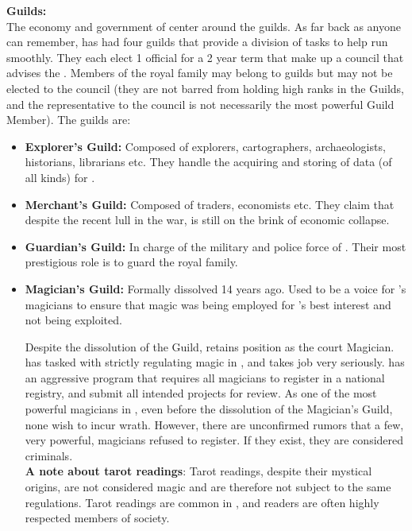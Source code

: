 \documentclass[blue]{NeptuneBall}
\begin{document}
{\bf Guilds:}\\
The economy and government of \pAtlantis{} center around the guilds. As far back as anyone can remember, \pAtlantis{} has had four guilds that provide a division of tasks to help \pAtlantis{} run smoothly. They each elect 1 official for a 2 year term that make up a council that advises the \cKing{\King}.  Members of the royal family may belong to guilds but may not be elected to the council (they are not barred from holding high ranks in the Guilds, and the representative to the council is not necessarily the most powerful Guild Member). The guilds are:
\begin{itemize}
  \item {\bf Explorer's Guild:} Composed of explorers, cartographers, archaeologists, historians, librarians etc. They handle the acquiring and storing of data (of all kinds) for \pAtlantis{}.
  \item{\bf Merchant's Guild:} Composed of traders, economists etc. They claim that despite the recent lull in the war, \pAtlantis{} is still on the brink of economic collapse.
  \item {\bf Guardian's Guild:} In charge of the military and police force of \pAtlantis{}. Their most prestigious role is to guard the royal family.
  \item {\bf Magician's Guild:}  Formally dissolved 14 years ago. Used to be a voice for \pAtlantis{}'s magicians to ensure that magic was being employed for \pAtlantis{}'s best interest and not being exploited. 
  
  Despite the dissolution of the Guild, \cManta{} retains \cManta{\their} position as the court Magician. \cKing{} has tasked \cManta{} with strictly regulating magic in \pAtlantis{}, and \cManta{} takes \cManta{\their} job very seriously. \cManta{} has an aggressive program that requires all magicians to register in a national registry, and submit all intended projects for review. As one of the most powerful magicians in \pAtlantis{}, even before the dissolution of the Magician's Guild, none wish to incur \cManta{\their} wrath. However, there are unconfirmed rumors that a few, very powerful, magicians refused to register. If they exist, they are considered criminals.\\
  
  {\bf A note about tarot readings}: Tarot readings, despite their mystical origins, are not considered magic and are therefore not subject to the same regulations. Tarot readings are common in \pAtlantis{}, and readers are often highly respected members of society.
\end{itemize}
\end{document}

